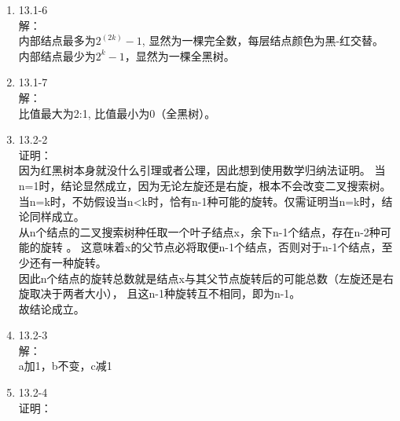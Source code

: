 \documentclass[UTF8]{ctexart}
\begin{document}
\begin{enumerate}
	\item 13.1-6 \\
	解：\\
		内部结点最多为$2^(2k)-1$, 显然为一棵完全数，每层结点颜色为黑-红交替。\\
		内部结点最少为$2^k-1$，显然为一棵全黑树。
		
	\item 13.1-7 \\
	解：\\
		比值最大为2:1, 比值最小为0（全黑树）。
		
	\item 13.2-2 \\
	证明：\\
		因为红黑树本身就没什么引理或者公理，因此想到使用数学归纳法证明。
		当n=1时，结论显然成立，因为无论左旋还是右旋，根本不会改变二叉搜索树。
		当n=k时，不妨假设当n<k时，恰有n-1种可能的旋转。仅需证明当n=k时，结论同样成立。\\
		从n个结点的二叉搜索树种任取一个叶子结点x，余下n-1个结点，存在n-2种可能的旋转 。
		这意味着x的父节点必将取便n-1个结点，否则对于n-1个结点，至少还有一种旋转。\\
		因此n个结点的旋转总数就是结点x与其父节点旋转后的可能总数（左旋还是右旋取决于两者大小），
		且这n-1种旋转互不相同，即为n-1。\\
		故结论成立。
		
	\item 13.2-3 \\
	解：\\
		a加1，b不变，c减1
		
	\item 13.2-4 \\
	证明：\\
		
	
\end{enumerate}
\end{document}
